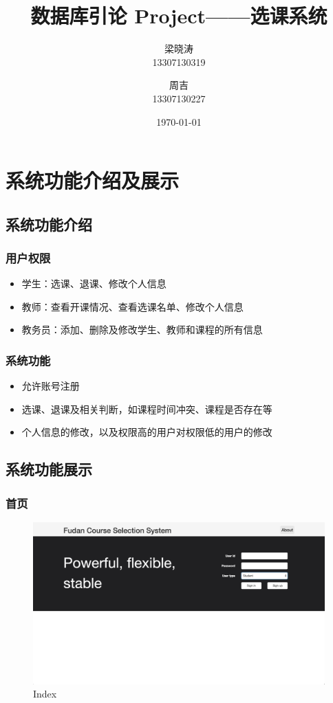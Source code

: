 \documentclass[a4paper, 11pt, nofonts, nocap, fancyhdr]{ctexart}
\title{数据库引论 Project——选课系统}
\author
{
	梁晓涛\\
	13307130319
	\and
	周吉\\
	13307130227
}
\date{\today}
\begin{document}
\maketitle
\tableofcontents
\setcounter{page}{0}
\thispagestyle{empty}
\newpage

\section{系统功能介绍及展示}

\subsection{系统功能介绍}

\subsubsection{用户权限}
\begin{itemize}
    \item 学生：选课、退课、修改个人信息
    \item 教师：查看开课情况、查看选课名单、修改个人信息
    \item 教务员：添加、删除及修改学生、教师和课程的所有信息
\end{itemize}

\subsubsection{系统功能}
\begin{itemize}
    \item 允许账号注册
    \item 选课、退课及相关判断，如课程时间冲突、课程是否存在等
    \item 个人信息的修改，以及权限高的用户对权限低的用户的修改
\end{itemize}

\subsection{系统功能展示}

\subsubsection{首页}

	\begin{figure}[ht]
		\centering
		\includegraphics[width=6in]{overview}
		\caption{Index}
	\end{figure}
\end{document}
